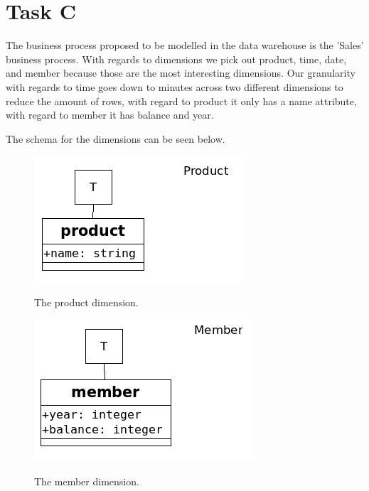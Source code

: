 	\section{Task C}
	The business process proposed to be modelled in the data warehouse is the 'Sales' business process. With regards to dimensions we pick out product, time, date, and member because those are the most interesting dimensions. Our granularity with regards to time goes down to minutes across two different dimensions to reduce the amount of rows, with regard to product it only has a name attribute, with regard to member it has balance and year.
	
	The schema for the dimensions can be seen below. 
	
	\begin{minipage}{0.45\textwidth}
	\begin{figure}[H]
		\centering
		\includegraphics[scale=0.5]{dimensionProduct}
		\label{image:product}
		\caption{The product dimension.}
		\end{figure}
	\end{minipage}
	\begin{minipage}{0.45\textwidth}
	\begin{figure}[H]
	\centering
	\includegraphics[scale=0.5]{dimensionMember}
	\label{image:member}
	\caption{The member dimension.}
	\end{figure}
	\end{minipage}
	
